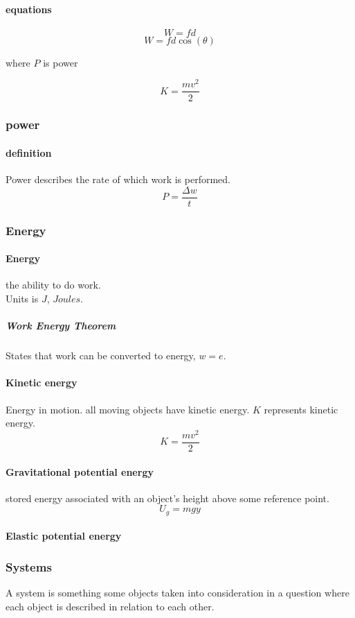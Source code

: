 \documentclass{article} %
\begin{document}
            \paragraph{equations}
                \begin{equation} W=fd \end{equation}
                \begin{equation} W=fd\cos(\theta) \end{equation}
                \begin{center} where $P$ is power \end{center}
                \begin{equation}
                    K=\frac{mv^2}{2}
                \end{equation}
        \subsubsection{power}
            \paragraph{definition}
                Power describes the rate of which work is performed.
                \begin{equation} P=\dfrac{\Delta w}{t} \end{equation}
        \subsubsection{Energy}
            \paragraph{Energy}
                the ability to do work.\\ Units is $J$, $Joules$.
                \subparagraph{Work Energy Theorem}
                    States that work can be converted to energy, $w=e$.
            \paragraph{Kinetic energy}
                Energy in motion. all moving objects have kinetic energy. $K$ represents kinetic energy.
                $$K=\frac{mv^2}{2}$$ 
            \paragraph{Gravitational potential energy}%
            \label{par:Gravitational potential energy}
                stored energy associated with an object's height above some reference point.
                \begin{equation}
                    U_g=mgy
                \end{equation}
            \paragraph{Elastic potential energy}
        \subsubsection{Systems}                
            A system is something some objects taken into consideration in a question where each object is described in relation to each other.
\end{document}
